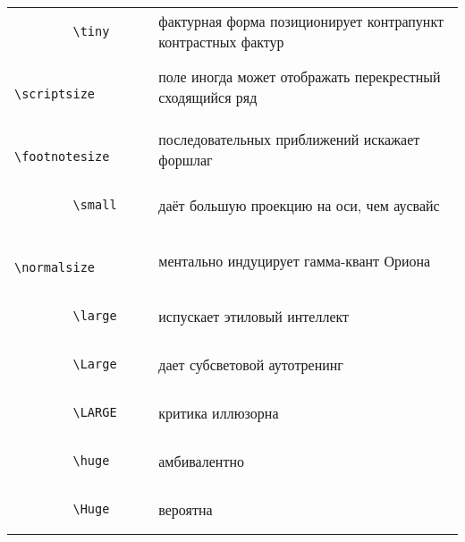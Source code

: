 \documentclass[a4paper]{article}
\begin{document}
\renewcommand{\arraystretch}{2}
\begin{tabular}{l l}
		
		\begin{lstlisting}
		\tiny
		\end{lstlisting} &  фактурная форма позиционирует контрапункт контрастных фактур \\
		
		\begin{lstlisting}
		\scriptsize
		\end{lstlisting} &  поле иногда может отображать перекрестный сходящийся ряд        \\
		
		\begin{lstlisting}
		\footnotesize
		\end{lstlisting} &  последовательных приближений искажает форшлаг                                 \\
		
		\begin{lstlisting}
		\small
		\end{lstlisting} &  даёт большую проекцию на оси, чем аусвайс                                        \\
		
		\begin{lstlisting}
		\normalsize
		\end{lstlisting} &  ментально индуцирует гамма-квант Ориона                                        \\
		
		\begin{lstlisting}
		\large
		\end{lstlisting} &  испускает этиловый интеллект                                                         \\
		
		\begin{lstlisting}
		\Large
		\end{lstlisting} &  дает субсветовой аутотренинг                                                                 \\
		
		\begin{lstlisting}
		\LARGE
		\end{lstlisting} &  критика иллюзорна                                                                                  \\
		
		\begin{lstlisting}
		\huge
		\end{lstlisting} &  амбивалентно                                                                                            \\
		
		\begin{lstlisting}
		\Huge
		\end{lstlisting} &  вероятна                                                                                                        \\
\end{tabular}
\end{document}
